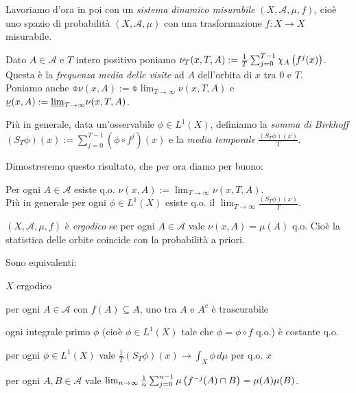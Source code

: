 Lavoriamo d'ora in poi con un \emph{sistema dinamico misurabile} $(X,\mathcal{A},\mu,f)$,
cioè uno spazio di probabilità $(X,\mathcal{A},\mu)$ con una trasformazione $f:X\to X$ misurabile.

\begin{defi}Dato $A\in\mathcal{A}$ e $T$ intero positivo poniamo $\nu_T(x,T,A):=\frac{1}{T}\sum_{j=0}^{T-1}\chi_A\left(f^j(x)\right)$.
Questa è la \emph{frequenza media delle visite} ad $A$ dell'orbita di $x$ tra $0$ e $T$. \\
Poniamo anche $\obar{\nu}(x,A):=\obar{\lim}_{T\to\infty}\nu(x,T,A)$ e $\underline{\nu}(x,A):=\underline{\lim}_{T\to\infty}\nu(x,T,A)$.
\end{defi}

\begin{defi}Più in generale, data un'osservabile $\phi\in L^1(X)$, definiamo la \emph{somma di Birkhoff} $(S_T\phi)(x):=\sum_{j=0}^{T-1}(\phi\circ f^j)(x)$
e la \emph{media temporale} $\frac{(S_T\phi)(x)}{T}$.
\end{defi}

Dimostreremo questo risultato, che per ora diamo per buono:

\begin{teo}[Birkhoff]Per ogni $A\in\mathcal{A}$ esiste q.o. $\nu(x,A):=\lim_{T\to\infty}\nu(x,T,A)$. \\
Più in generale per ogni $\phi\in L^1(X)$ esiste q.o. il $\lim_{T\to\infty}\frac{(S_T\phi)(x)}{T}$.
\end{teo}

\begin{defi}$(X,\mathcal{A},\mu,f)$ è \emph{ergodico} se per ogni $A\in\mathcal{A}$ vale $\nu(x,A)=\mu(A)$ q.o.
Cioè \lcap la statistica delle orbite coincide con la probabilità a priori\rcap.
\end{defi}

\begin{teo}Sono equivalenti:
\begin{lista}
	\item $X$ ergodico 
	\item per ogni $A\in\mathcal{A}$ con $f(A)\subseteq A$, uno tra $A$ e $A^c$ è trascurabile 
	\item ogni integrale primo $\phi$ (cioè $\phi\in L^1(X)$ tale che $\phi=\phi\circ f$ q.o.) è costante q.o. 
	\item per ogni $\phi\in L^1(X)$ vale $\frac{1}{T}(S_T\phi)(x)\to\int_X \phi\,d\mu$ per q.o. $x$ 
	\item per ogni $A,B\in\mathcal{A}$ vale $\lim_{n\to\infty}\frac{1}{n}\sum_{j=0}^{n-1}\mu\left(f^{-j}(A)\cap B\right)=\mu(A)\mu(B)$. 
\end{lista}
\end{teo}

